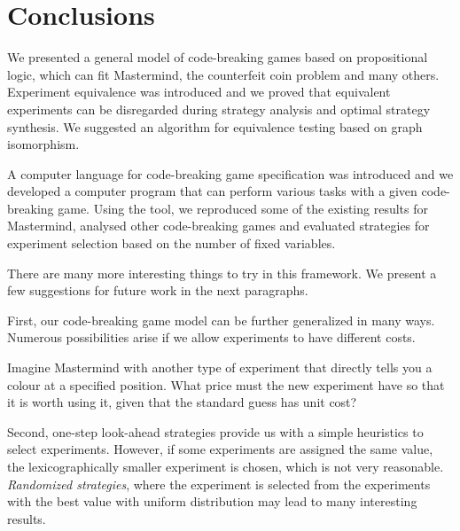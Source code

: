 \chapter{Conclusions} \label{ch:conclusions}
We presented a general model of code-breaking games based on propositional logic,
  which can fit Mastermind, the counterfeit coin problem and many others.
Experiment equivalence was introduced and we proved that
  equivalent experiments can be disregarded during strategy analysis and
  optimal strategy synthesis.
We suggested an algorithm for equivalence
  testing based on graph isomorphism.

A computer language for code-breaking game specification was introduced
  and we developed a computer program that can perform various tasks
  with a given code-breaking game.
Using the tool, we reproduced some of the existing results for Mastermind,
  analysed other code-breaking games and
  evaluated strategies for experiment selection
  based on the number of fixed variables.

There are many more interesting things to try in this framework.
We present a few suggestions for future work in the next paragraphs.

First, our code-breaking game model can be further generalized in many ways.
Numerous possibilities arise if we allow experiments to have different costs.

Imagine Mastermind with another type of experiment
  that directly tells you a colour at a specified position.
What price must the new experiment have so that
  it is worth using it, given that the standard guess has unit cost?


Second, one-step look-ahead strategies provide us with
  a simple heuristics to select experiments.
However, if some experiments are assigned the same value, the
  lexicographically smaller experiment is chosen,
  which is not very reasonable.
\emph{Randomized strategies},
  where the experiment is selected from the experiments
  with the best value with uniform distribution
  may lead to many interesting results.

